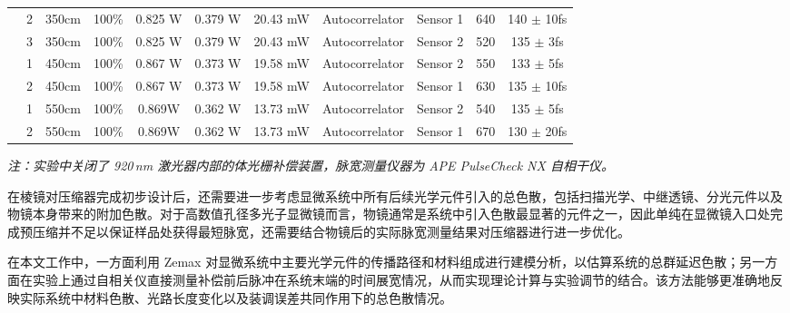 \begin{table}[htbp]
{\begin{tabular}{ccccccccccc}
\rowcolor[HTML]{E7EAED}
\cellcolor[HTML]{E7EAED} &
  2 &
  \cellcolor[HTML]{83CBEB}350cm &
  100\% &
  0.825 W &
  0.379 W &
  20.43 mW &
  Autocorrelator &
  Sensor 1 &
  640 &
  140 $\pm$ 10fs \\
\rowcolor[HTML]{E7EAED}
\multirow{-3}{*}{\cellcolor[HTML]{E7EAED}2} &
  3 &
  \cellcolor[HTML]{83CBEB}350cm &
  100\% &
  0.825 W &
  0.379 W &
  20.43 mW &
  Autocorrelator &
  Sensor 2 &
  520 &
  135 $\pm$ 3fs \\ \hline
\rowcolor[HTML]{E7EAED}
\cellcolor[HTML]{E7EAED} &
  1 &
  \cellcolor[HTML]{E59EDD}450cm &
  100\% &
  0.867 W &
  0.373 W &
  19.58 mW &
  Autocorrelator &
  Sensor 2 &
  550 &
  133 $\pm$ 5fs \\
\rowcolor[HTML]{E7EAED}
\multirow{-2}{*}{\cellcolor[HTML]{E7EAED}3} &
  2 &
  \cellcolor[HTML]{E59EDD}450cm &
  100\% &
  0.867 W &
  0.373 W &
  19.58 mW &
  Autocorrelator &
  Sensor 1 &
  630 &
  135 $\pm$ 10fs \\ \hline
\rowcolor[HTML]{E7EAED}
\cellcolor[HTML]{E7EAED} &
  1 &
  \cellcolor[HTML]{8ED973}550cm &
  100\% &
  0.869W &
  0.362 W &
  13.73 mW &
  Autocorrelator &
  Sensor 2 &
  540 &
  135 $\pm$ 5fs \\
\rowcolor[HTML]{E7EAED}
\multirow{-2}{*}{\cellcolor[HTML]{E7EAED}4} &
  2 &
  \cellcolor[HTML]{8ED973}550cm &
  100\% &
  0.869W &
  0.362 W &
  13.73 mW &
  Autocorrelator &
  Sensor 1 &
  670 &
  130 $\pm$ 20fs \\ \hline
\end{tabular}%
}
\vspace{2mm}
\begin{minipage}{\textwidth}
\footnotesize
\textit{注：实验中关闭了 920\,nm 激光器内部的体光栅补偿装置，脉宽测量仪器为 APE PulseCheck NX 自相干仪。}
\end{minipage}
\end{table}

在棱镜对压缩器完成初步设计后，还需要进一步考虑显微系统中所有后续光学元件引入的总色散，包括扫描光学、中继透镜、分光元件以及物镜本身带来的附加色散。对于高数值孔径多光子显微镜而言，物镜通常是系统中引入色散最显著的元件之一，因此单纯在显微镜入口处完成预压缩并不足以保证样品处获得最短脉宽，还需要结合物镜后的实际脉宽测量结果对压缩器进行进一步优化。

在本文工作中，一方面利用 Zemax 对显微系统中主要光学元件的传播路径和材料组成进行建模分析，以估算系统的总群延迟色散；另一方面在实验上通过自相关仪直接测量补偿前后脉冲在系统末端的时间展宽情况，从而实现理论计算与实验调节的结合。该方法能够更准确地反映实际系统中材料色散、光路长度变化以及装调误差共同作用下的总色散情况。

